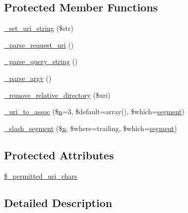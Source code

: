 \subsection*{Protected Member Functions}
\begin{DoxyCompactItemize}
\item 
\mbox{\hyperlink{class_c_i___u_r_i_a81a4c4d50fbac24b9ae091f9cfcaade3}{\+\_\+set\+\_\+uri\+\_\+string}} (\$str)
\item 
\mbox{\hyperlink{class_c_i___u_r_i_ae2e75a6f6657df51c7b6de926979af29}{\+\_\+parse\+\_\+request\+\_\+uri}} ()
\item 
\mbox{\hyperlink{class_c_i___u_r_i_a2bb6abbe64a923ffef79a4a4c3da93db}{\+\_\+parse\+\_\+query\+\_\+string}} ()
\item 
\mbox{\hyperlink{class_c_i___u_r_i_a336e05909197d401613263ebdab6550c}{\+\_\+parse\+\_\+argv}} ()
\item 
\mbox{\hyperlink{class_c_i___u_r_i_a01fdc82a66a1611d3e5d42461c1ad59c}{\+\_\+remove\+\_\+relative\+\_\+directory}} (\$uri)
\item 
\mbox{\hyperlink{class_c_i___u_r_i_a8a4949bcf405b03c1bf2cd94e689a0c7}{\+\_\+uri\+\_\+to\+\_\+assoc}} (\$\mbox{\hyperlink{cli_2error__php_8php_a2e6b16bbc42094e4c51ade3c10afdcf1}{n}}=3, \$default=array(), \$which=\textquotesingle{}\mbox{\hyperlink{class_c_i___u_r_i_aeea297fbd38079886a2de35d633c1ed5}{segment}}\textquotesingle{})
\item 
\mbox{\hyperlink{class_c_i___u_r_i_a98974ace6ccf1b5e0923a7de9018095a}{\+\_\+slash\+\_\+segment}} (\$\mbox{\hyperlink{cli_2error__php_8php_a2e6b16bbc42094e4c51ade3c10afdcf1}{n}}, \$where=\textquotesingle{}trailing\textquotesingle{}, \$which=\textquotesingle{}\mbox{\hyperlink{class_c_i___u_r_i_aeea297fbd38079886a2de35d633c1ed5}{segment}}\textquotesingle{})
\end{DoxyCompactItemize}
\subsection*{Protected Attributes}
\begin{DoxyCompactItemize}
\item 
\mbox{\hyperlink{class_c_i___u_r_i_a5f6c67e88b35c1006295f41bc878f8b7}{\$\+\_\+permitted\+\_\+uri\+\_\+chars}}
\end{DoxyCompactItemize}


\subsection{Detailed Description}


